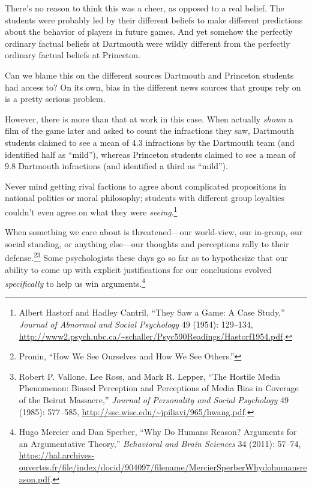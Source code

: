 {
 There's no reason to think this was a cheer, as
opposed to a real belief. The students were probably led by their
different beliefs to make different predictions about the behavior of
players in future games. And yet somehow the perfectly ordinary factual
beliefs at Dartmouth were wildly different from the perfectly ordinary
factual beliefs at Princeton.}

{
 Can we blame this on the different sources Dartmouth and Princeton
students had access to? On its own, bias in the different news sources
that groups rely on is a pretty serious problem.}

{
 However, there is more than that at work in this case. When
actually \textit{shown} a film of the game later and asked to count the
infractions they saw, Dartmouth students claimed to see a mean of 4.3
infractions by the Dartmouth team (and identified half as
``mild''), whereas Princeton
students claimed to see a mean of 9.8 Dartmouth infractions (and
identified a third as ``mild'').}

{
 Never mind getting rival factions to agree about complicated
propositions in national politics or moral philosophy; students with
different group loyalties couldn't even agree on what
they were \textit{seeing}.\footnote{Albert Hastorf and Hadley Cantril, ``They Saw
a Game: A Case Study,'' \textit{Journal of Abnormal
and Social Psychology} 49 (1954): 129--134,
\url{http://www2.psych.ubc.ca/~schaller/Psyc590Readings/Hastorf1954.pdf}.}}

{
 When something we care about is threatened---our world-view, our
in-group, our social standing, or anything else---our thoughts and
perceptions rally to their defense.\footnote{Pronin, ``How We See Ourselves and How We See
Others.''}\supercomma\footnote{Robert P. Vallone, Lee Ross, and Mark R. Lepper,
``The Hostile Media Phenomenon: Biased Perception and
Perceptions of Media Bias in Coverage of the Beirut
Massacre,'' \textit{Journal of Personality and Social
Psychology} 49 (1985): 577--585,
\url{http://ssc.wisc.edu/\~jpiliavi/965/hwang.pdf}.} Some
psychologists these days go so far as to hypothesize that our ability
to come up with explicit justifications for our conclusions evolved
\textit{specifically} to help us win arguments.\footnote{Hugo Mercier and Dan Sperber, ``Why Do Humans
Reason? Arguments for an Argumentative Theory,''
\textit{Behavioral and Brain Sciences} 34 (2011): 57--74,
\url{https://hal.archives-ouvertes.fr/file/index/docid/904097/filename/MercierSperberWhydohumansreason.pdf}.}}

